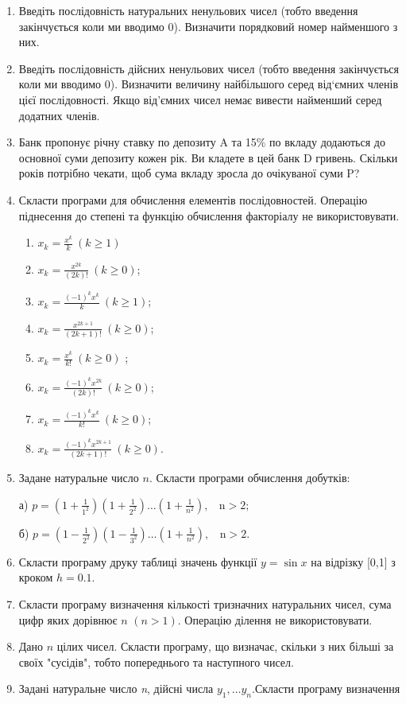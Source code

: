\documentclass[]{article}
\makeatletter
\newcommand{\xslalph}[1]{\expandafter\@xslalph\csname c@#1\endcsname}
\newcommand{\@xslalph}[1]{%
    \ifcase#1\or а\or б\or в\or г\or д\or e\or є\or ж\or з\or i%
    \or й\or к\or л\or м\or н\or о\or п\or р\or с\or т%
    \or у\or ф\or х\or ц\or ч\or ш\or ю\or я\or аа\or бб\or вв%
    \else\@ctrerr\fi%
}
\makeatother
\begin{document}
\begin{enumerate}
\item
  Введіть послідовність натуральних ненульових чисел (тобто введення
  закінчується коли ми вводимо 0). Визначити порядковий номер найменшого
  з них.
\item
  Введіть послідовність дійсних ненульових чисел (тобто введення
  закінчується коли ми вводимо 0). Визначити величину найбільшого серед
  від`ємних членів цієї послідовності. Якщо від'ємних чисел немає
  вивести найменший серед додатних членів.
\item
  Банк пропонує річну ставку по депозиту A та 15\% по вкладу додаються
  до основної суми депозиту кожен рік. Ви кладете в цей банк D гривень.
  Скільки років потрібно чекати, щоб сума вкладу зросла до очікуваної
  суми P?
\item
  Скласти програми для обчислення елементів послідовностей. Операцію
  піднесення до степені та функцію обчислення факторіалу не
  використовувати.
\begin{enumerate}[label=\xslalph*)]
\item
\(x_{k} = \frac{x^{k}}{k}\ (k \geq 1)\) 
\item
\(x_{k} = \frac{x^{2k}}{(2k)!}\ (k \geq 0)\);
\item \(x_{k} = \frac{( - 1)^{k}x^{k}}{k}\ (k \geq 1)\); 
\item
\(x_{k} = \frac{x^{2k + 1}}{(2k + 1)!}\ (k \geq 0)\);
\item \(x_{k} = \frac{x^{k}}{k!}\ (k \geq 0)\) ;
\item \(x_{k} = \frac{(-1)^{k}x^{2k}}{(2k)!}\ (k \geq 0)\);
\item \(x_{k} = \frac{(-1)^{k}x^{k}}{k!}\ (k \geq 0)\); 
\item \(x_{k} = \frac{(-1)^{k}x^{2k + 1}}{(2k + 1)!}\ (k \geq  0)\).
 \end{enumerate}

\item
  Задане натуральне число \(n\). Скласти програми обчислення добутків:

а)
\(p = \left( 1 + \frac{1}{1^{2}} \right)\left( 1 + \frac{1}{2^{2}} \right)\ldots\left( 1 + \frac{1}{n^{2}} \right),\mathrm{\ \ \ \ n > 2};\)

б)
\(p = \left( 1 - \frac{1}{2^{2}} \right)\left( 1 - \frac{1}{3^{2}} \right)\ldots\left( 1 + \frac{1}{n^{2}} \right),\mathrm{\ \ \ \ n > 2.}\)

\item
  Скласти програму друку таблиці значень функції \(y = \sin x\) на
  відрізку {[}0,1{]} з кроком \(h = 0.1\).
\item
  Скласти програму визначення кількості тризначних натуральних чисел,
  сума цифр яких дорівнює \(n\) \((n > 1)\). Операцію ділення не
  використовувати.
\item
  Дано \(n\) цілих чисел. Скласти програму, що визначає, скільки з
  них більші за своїх "сусідів", тобто попереднього та наступного чисел.
\item
  Задані натуральне число \emph{n}, дійсні числа
  \(y_{1},\ldots y_{n}.\)Скласти програму визначення


\end{enumerate}
\end{document}
